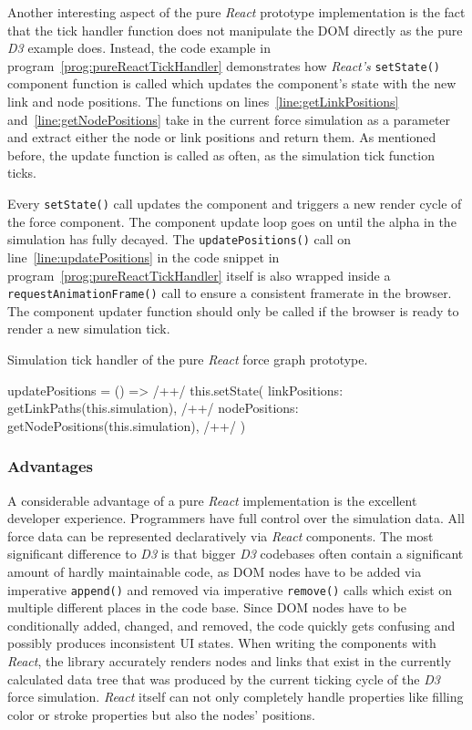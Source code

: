 Another interesting aspect of the pure \emph{React} prototype implementation is the fact that the tick handler function does not manipulate the DOM directly as the pure \emph{D3} example does. Instead, the code example in program~\ref{prog:pureReactTickHandler} demonstrates how \emph{React's} \texttt{setState()} component function is called which updates the component's state with the new link and node positions. The functions on lines~\ref{line:getLinkPositions} and~\ref{line:getNodePositions} take in the current force simulation as a parameter and extract either the node or link positions and return them. As mentioned before, the update function is called as often, as the simulation tick function ticks. 

Every \texttt{setState()} call updates the component and triggers a new render cycle of the force component. The component update loop goes on until the alpha in the simulation has fully decayed. The \texttt{updatePositions()} call on line~\ref{line:updatePositions} in the code snippet in program~\ref{prog:pureReactTickHandler} itself is also wrapped inside a \texttt{requestAnimationFrame()} call to ensure a consistent framerate in the browser. The component updater function should only be called if the browser is ready to render a new simulation tick.

\begin{program}
\caption{Simulation tick handler of the pure \emph{React} force graph prototype.}
\label{prog:pureReactTickHandler}
\begin{JsCode}
updatePositions = () => { /+\label{line:updatePositions}+/
  this.setState({
    linkPositions: getLinkPaths(this.simulation), /+\label{line:getLinkPositions}+/
    nodePositions: getNodePositions(this.simulation), /+\label{line:getNodePositions}+/
  })
}
\end{JsCode}
\end{program}

\subsubsection{Advantages}

A considerable advantage of a pure \emph{React} implementation is the excellent developer experience. Programmers have full control over the simulation data. All force data can be represented declaratively via \emph{React} components. The most sig\-nifi\-cant difference to \emph{D3} is that bigger \emph{D3} codebases often contain a sig\-nifi\-cant amount of hardly maintainable code, as DOM nodes have to be added via imperative \texttt{append()} and removed via imperative \texttt{remove()} calls which exist on multiple different places in the code base. Since DOM nodes have to be conditionally added, changed, and removed, the code quickly gets confusing and possibly produces inconsistent UI states. When writing the components with \emph{React}, the library accurately renders nodes and links that exist in the currently calculated data tree that was produced by the current ticking cycle of the \emph{D3} force simulation. \emph{React} itself can not only completely handle properties like filling color or stroke properties but also the nodes' positions.

